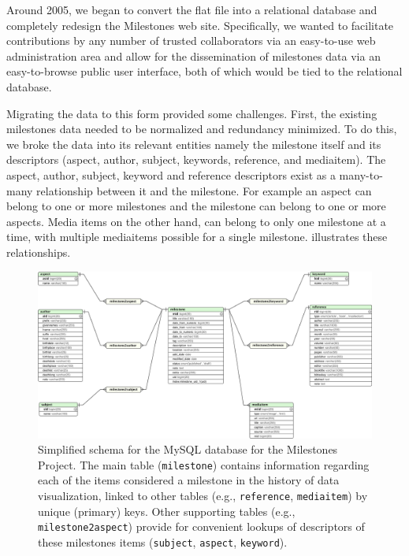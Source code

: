 Around 2005, we began to convert the flat file into a relational database and completely redesign the Milestones 
web site. Specifically, we wanted to facilitate contributions by any number of trusted
collaborators via an easy-to-use web administration area and allow for the dissemination of milestones data 
via an easy-to-browse public user interface, both of which would be tied to the relational database.

Migrating the data to this form provided some challenges. First, the existing milestones data needed to be
normalized and redundancy minimized. To do this, we broke the data into its relevant entities namely the 
milestone itself and its descriptors (aspect, author, subject, keywords, reference, and mediaitem).
The aspect, author, subject, keyword and reference descriptors exist as a many-to-many relationship between 
it and the milestone. For example an aspect can belong to one or more milestones and the milestone can belong to 
one or more aspects. Media items on the other hand, can belong to only one milestone at a time, with
multiple mediaitems possible for a single milestone.  illustrates these relationships.

\begin{figure}[!htb]
  \centering
  \includegraphics[width=\textwidth,clip]{fig/datavis-schema-2}
  \caption{Simplified schema for the MySQL database for the Milestones Project. The main 
  table (\texttt{milestone}) contains information regarding each of the items considered
  a milestone in the history of data visualization, linked to other tables 
  (e.g., \texttt{reference}, \texttt{mediaitem}) by unique (primary) keys.
  Other supporting tables (e.g., \texttt{milestone2aspect}) provide for convenient lookups of 
  descriptors of these milestones items (\texttt{subject}, \texttt{aspect}, \texttt{keyword}).
  }
  \label{fig:datavis-schema-2}
\end{figure}

